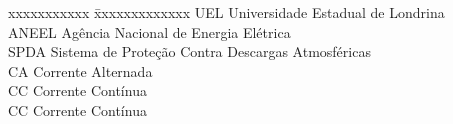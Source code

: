 
\begin{tabbing}
xxxxxxxxxxx \= xxxxxxxxxxxxx \kill
\textsc{UEL}            \> Universidade Estadual de Londrina\\
\textsc{ANEEL}            \> Agência Nacional de Energia Elétrica\\
\textsc{SPDA}          \> Sistema de Proteção Contra Descargas Atmosféricas\\
\textsc{CA}            \> Corrente Alternada\\
\textsc{CC}            \> Corrente Contínua\\
\textsc{CC}            \> Corrente Contínua\\

\end{tabbing}
